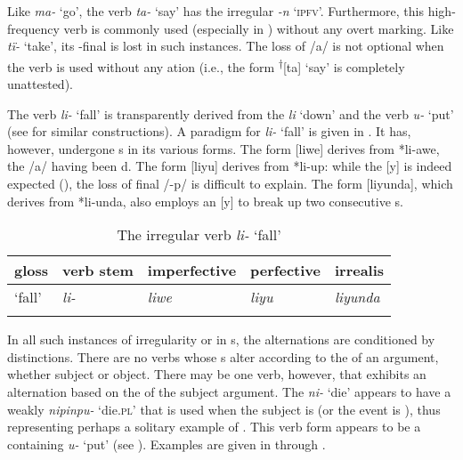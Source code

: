 Like \textit{ma-} ‘go’, the verb \textit{ta-} ‘say’ has the irregular   \textit{-n} ‘\textsc{ipfv}’. Furthermore, this high-frequency verb is commonly used (especially in  ) without any overt  marking. Like \textit{tï-} ‘take’, its -final  is lost in such instances. The loss of /a/ is not optional when the verb is used without any  ation (i.e., the form \textsuperscript{†}[ta] ‘say’ is completely unattested).

The verb \textit{li-} ‘fall’ is transparently derived from the  \textit{li} ‘down’ and the verb \textit{u-} ‘put’ (see  for similar constructions). A paradigm for \textit{li-} ‘fall’ is given in . It has, however, undergone s in its various forms. The  form [liwe] derives from *li-awe, the /a/ having been d. The  form [liyu] derives from *li-up: while the  [y] is indeed expected (), the loss of final /-p/ is difficult to explain. The  form [liyunda], which derives from *li-unda, also employs an  [y] to break up two consecutive s.

\begin{table}
\caption{The irregular verb \textit{li-} ‘fall’}
\label{tab:4.10}
\begin{tabularx}{\textwidth}{QQQQQ}
\lsptoprule
gloss & verb stem & imperfective & perfective & irrealis\\
\midrule
‘fall’ & {\itshape li-} & {\itshape liwe} & {\itshape liyu} & {\itshape liyunda}\\
\lspbottomrule
\end{tabularx}
\end{table}

  In all such instances of irregularity or  in s, the alternations are conditioned by  distinctions. There are no verbs whose s alter according to the  of an argument, whether subject or object. There may be one verb, however, that exhibits an alternation based on the  of the subject argument. The  \textit{ni-} ‘die’ appears to have a weakly   \textit{nipinpu-} ‘die.\textsc{pl}’ that is used when the subject is  (or the event is ), thus representing perhaps a solitary example of . This  verb form appears to be a  containing \textit{u-} ‘put’ (see ). Examples are given in  through .

